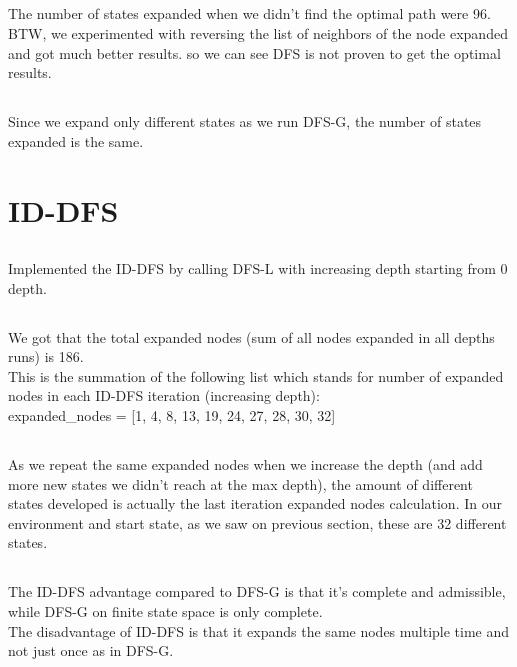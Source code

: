 \documentclass[12pt]{article}
\begin{document}
\subsection{}
The number of states expanded when we didn't find the optimal path were 96.\\
BTW, we experimented with reversing the list of neighbors of the node expanded and got much better results. so we can see DFS is not proven to get the optimal results.

\subsection{}
Since we expand only different states as we run DFS-G, the number of states expanded is the same.

\section{ID-DFS}
\subsection{}
Implemented the ID-DFS by calling DFS-L with increasing depth starting from 0 depth.

\subsection{}
We got that the total expanded nodes (sum of all nodes expanded in all depths runs) is 186.\\
This is the summation of the following list which stands for number of expanded nodes in each ID-DFS iteration (increasing depth):\\
expanded\_nodes = [1, 4, 8, 13, 19, 24, 27, 28, 30, 32]

\subsection{}
As we repeat the same expanded nodes when we increase the depth (and add more new states we didn't reach at the max depth), the amount of different states developed is actually the last iteration expanded nodes calculation. In our environment and start state, as we saw on previous section, these are 32 different states.

\subsection{}
The ID-DFS advantage compared to DFS-G is that it's complete and admissible, while DFS-G on finite state space is only complete.\\
The disadvantage of ID-DFS is that it expands the same nodes multiple time and not just once as in DFS-G.
\end{document}
